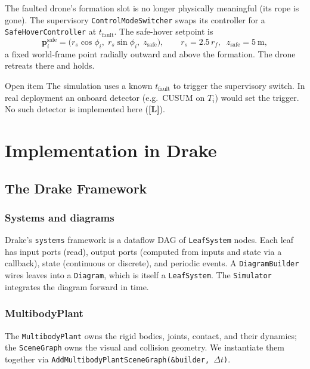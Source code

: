 \documentclass[11pt,a4paper,oneside]{report}
\newcommand{\bp}{\bm{p}}
\newcommand{\Lim}{\textcolor{red!60!black}{\textbf{[L]}}}
\begin{document}
The faulted drone's formation slot is no longer physically meaningful
(its rope is gone). The supervisory \texttt{ControlModeSwitcher}
swaps its controller for a \texttt{SafeHoverController} at
$t_{\text{fault}}$. The safe-hover setpoint is
\begin{equation}
\bp_i^\text{safe} = \big(r_s\cos\phi_i,\; r_s\sin\phi_i,\; z_\text{safe}\big),
\qquad r_s = 2.5\, r_f,\;\; z_\text{safe} = 5~\text{m},
\end{equation}
a fixed world-frame point radially outward and above the formation.
The drone retreats there and holds.

\begin{warning}{Open item}\label{sec:fault-open}
The simulation uses a known $t_{\text{fault}}$ to trigger the
supervisory switch. In real deployment an onboard detector (e.g.\
CUSUM on $T_i$) would set the trigger. No such detector is
implemented here (\Lim).
\end{warning}

\part{Implementation in Drake}

\chapter{The Drake Framework}
\label{chap:drake}

\section{Systems and diagrams}

Drake's \texttt{systems} framework is a dataflow DAG of
\texttt{LeafSystem} nodes. Each leaf has input ports (read), output
ports (computed from inputs and state via a callback), state
(continuous or discrete), and periodic events. A
\texttt{DiagramBuilder} wires leaves into a \texttt{Diagram}, which
is itself a \texttt{LeafSystem}. The \texttt{Simulator} integrates
the diagram forward in time.

\section{MultibodyPlant}

The \texttt{MultibodyPlant} owns the rigid bodies, joints, contact,
and their dynamics; the \texttt{SceneGraph} owns the visual and
collision geometry. We instantiate them together via
\texttt{AddMultibodyPlantSceneGraph(\&builder, $\Delta t$)}.
\end{document}
